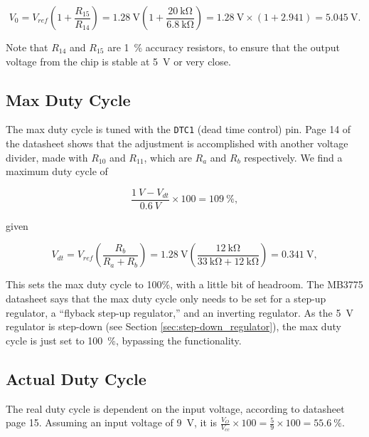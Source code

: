 \documentclass{article}
\newcommand{\chippin}{\texttt}
\newcommand{\model}{\textsf}
\begin{document}
\begin{displaymath}
  V_0 = V_{ref}\left(1+\frac{R_{15}}{R_{14}}\right) =
  \qty{1.28}{\volt}\left(1+\frac{\qty{20}{\kilo\ohm}}{\qty{6.8}{\kilo\ohm}}\right)
  = \qty{1.28}{\volt}\times{}(1+2.941) = \qty{5.045}{\volt}.
\end{displaymath}

Note that $R_{14}$ and $R_{15}$ are \qty{1}{\%} accuracy resistors, to
ensure that the output voltage from the chip is stable at
\qty{5}{\volt} or very close.


\subsection{Max Duty Cycle}
The max duty cycle is tuned with the \chippin{DTC1} (dead time
control) pin. Page 14 of the datasheet shows that the adjustment is
accomplished with another voltage divider, made with $R_{10}$ and
$R_{11}$, which are $R_a$ and $R_b$ respectively. We find a maximum
duty cycle of

\begin{displaymath}
  \frac{\qty{1}{V} - V_{dt}}{\qty{0.6}{V}}
  \times{} 100 = \qty{109}{\%},
\end{displaymath}

\noindent
given

\begin{displaymath}
  V_{dt} = V_{ref}\left(\frac{R_b}{R_a+R_b}\right) =
  \qty{1.28}{\volt}\left(
  \frac{\qty{12}{\kilo\ohm}}{\qty{33}{\kilo\ohm} +
    \qty{12}{\kilo\ohm}}\right) = \qty{0.341}{\volt},
\end{displaymath}

This sets the max duty cycle to 100\%, with a little bit of
headroom. The \model{MB3775} datasheet says that the max duty cycle
only needs to be set for a step-up regulator, a ``flyback step-up
regulator,'' and an inverting regulator. As the \qty{5}{\volt}
regulator is step-down (see Section \ref{sec:step-down_regulator}),
the max duty cycle is just set to \qty{100}{\%}, bypassing the
functionality.

\subsection{Actual Duty Cycle}
The real duty cycle is dependent on the input voltage, according to
datasheet page 15. Assuming an input voltage of \qty{9}{\volt}, it is
$\frac{V_O}{V_{cc}}\times{}100 = \frac{5}{9}\times{}100 =
\qty{55.6}{\%}$.
\end{document}
